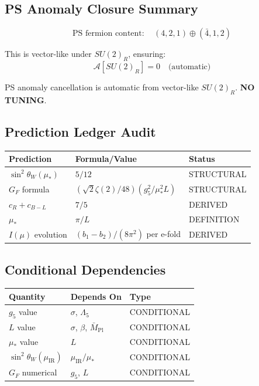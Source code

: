 \documentclass[11pt,a4paper]{article}
\begin{document}
\subsection{PS Anomaly Closure Summary}
\label{subsec:ps-anomaly-closure}

\begin{equation}
\label{eq:anomaly-closure}
\text{PS fermion content}: \quad (4, 2, 1) \oplus (\bar{4}, 1, 2)
\end{equation}

This is vector-like under $SU(2)_R$, ensuring:
\begin{equation}
\label{eq:anomaly-vanish}
\mathcal{A}[SU(2)_R] = 0 \quad \text{(automatic)}
\end{equation}

\begin{trapbox}
\label{trap:rt11}
PS anomaly cancellation is automatic from vector-like $SU(2)_R$. \textbf{NO TUNING}.
\end{trapbox}

\subsection{Prediction Ledger Audit}
\label{subsec:prediction-ledger}

\begin{center}
\begin{tabular}{lll}
\toprule
\textbf{Prediction} & \textbf{Formula/Value} & \textbf{Status} \\
\midrule
$\sin^2\theta_W(\mu_*)$ & $5/12$ & STRUCTURAL \\
$G_F$ formula & $(\sqrt{2}\zeta(2)/48)(g_5^2/\mu_*^2 L)$ & STRUCTURAL \\
$c_R + c_{B-L}$ & $7/5$ & DERIVED \\
$\mu_*$ & $\pi/L$ & DEFINITION \\
$I(\mu)$ evolution & $(b_1-b_2)/(8\pi^2)$ per e-fold & DERIVED \\
\bottomrule
\end{tabular}
\end{center}

\subsection{Conditional Dependencies}
\label{subsec:conditionals}

\begin{center}
\begin{tabular}{lll}
\toprule
\textbf{Quantity} & \textbf{Depends On} & \textbf{Type} \\
\midrule
$g_5$ value & $\sigma$, $\Lambda_5$ & CONDITIONAL \\
$L$ value & $\sigma$, $\beta$, $\bar{M}_{\text{Pl}}$ & CONDITIONAL \\
$\mu_*$ value & $L$ & CONDITIONAL \\
$\sin^2\theta_W(\mu_{\text{IR}})$ & $\mu_{\text{IR}}/\mu_*$ & CONDITIONAL \\
$G_F$ numerical & $g_5$, $L$ & CONDITIONAL \\
\bottomrule
\end{tabular}
\end{center}
\end{document}
